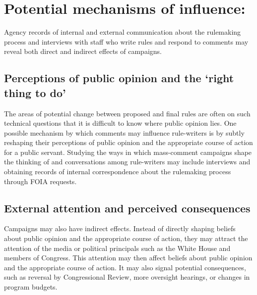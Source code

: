 \documentclass{article}
\begin{document}
\section*{Potential mechanisms of influence:}

Agency records of internal and external communication about the rulemaking process and interviews with staff who write rules and respond to comments may reveal both direct and indirect effects of campaigns.


\subsection*{Perceptions of public opinion and the `right thing to do'}

The areas of potential change between proposed and final rules are often on such technical questions that it is difficult to know where public opinion lies. One possible mechanism by which comments may influence rule-writers is by subtly reshaping their perceptions of public opinion and the appropriate course of action for a public servant. Studying  the ways in which mass-comment campaigns shape the thinking of and conversations among rule-writers may include interviews and obtaining records of internal correspondence about the rulemaking process through FOIA requests. %

\subsection*{External attention and perceived consequences}

Campaigns may also have indirect effects. Instead of directly shaping beliefs about public opinion and the appropriate course of action, they may attract the attention of the media or political principals such as the White House and members of Congress. This attention may then affect beliefs about public opinion and the appropriate course of action. It may also signal potential consequences, such as reversal by Congressional Review, more oversight hearings, or changes in program budgets. %
\end{document}
